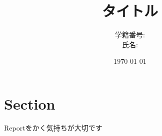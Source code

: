 \documentclass[dvipdfmx]{jsarticle}
\title{タイトル}
\author{学籍番号: \\氏名:}
\date{\today}
\begin{document}
  \maketitle
  \section{Section}
    Reportをかく気持ちが大切です
\end{document}

